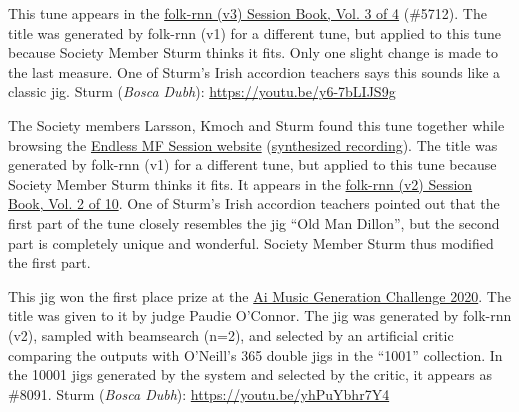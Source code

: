 \documentclass[a4paper,notitlepage,twoside]{book}
\begin{document}
{}
\hypertarget{jig:GallaghersFavourite}{}
This tune appears in the \href{https://highnoongmt.wordpress.com/2018/01/05/volumes-1-20-of-folk-rnn-v1-transcriptions}{folk-rnn (v3) Session Book, Vol. 3 of 4} (\#5712).
The title was generated by folk-rnn (v1) for a different tune, 
but applied to this tune because Society Member Sturm thinks it fits.
Only one slight change is made to the last measure.
One of Sturm's Irish accordion teachers says
this sounds like a classic jig.
Sturm ({\em Bosca Dubh}): \url{https://youtu.be/y6-7bLIJS9g}

{}
\hypertarget{jig:CleapersWheel}{}
The Society members Larsson, Kmoch and Sturm found this tune together 
while browsing the \href{http://www.eecs.qmul.ac.uk/~sturm/research/RNNIrishTrad/Session/}{Endless MF Session website}
(\href{http://www.eecs.qmul.ac.uk/~sturm/research/RNNIrishTrad/Session/5583_11843.mp3}{synthesized recording}).
The title was generated by folk-rnn (v1) for a different tune, 
but applied to this tune because Society Member Sturm thinks it fits.
It appears in the \href{https://highnoongmt.wordpress.com/2018/01/05/volumes-1-20-of-folk-rnn-v1-transcriptions}{folk-rnn (v2) Session Book, Vol. 2 of 10}.
One of Sturm's Irish accordion teachers pointed out that
the first part of the tune closely resembles the jig ``Old Man Dillon'',
but the second part is completely unique and wonderful.
Society Member Sturm thus modified the first part.

{}
  
\hypertarget{jig:Aiman}{}
This jig won the first place prize at the 
\href{https://highnoongmt.wordpress.com/2020/11/20/the-ai-music-generation-challenge-2020-summary-and-results/}{Ai Music Generation Challenge 2020}.
The title was given to it by judge Paudie O'Connor.
The jig was generated by folk-rnn (v2), sampled with beamsearch (n=2),
and selected by an artificial critic comparing the outputs
with O'Neill's 365 double jigs in the ``1001'' collection.
In the 10001 jigs generated by the system and selected by the critic,
it appears as \#8091.
Sturm ({\em Bosca Dubh}): \url{https://youtu.be/yhPuYbhr7Y4}
  
\end{document}
